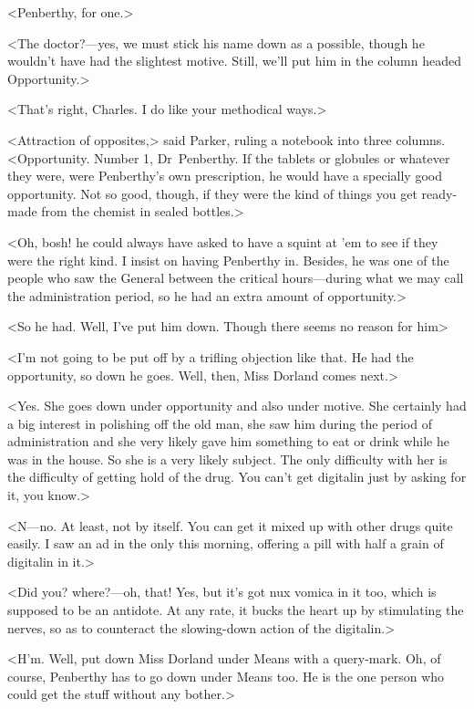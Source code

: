<Penberthy, for one.>

<The doctor?—yes, we must stick his name down as a possible, though he wouldn't have had the slightest motive. Still, we'll put him in the column headed Opportunity.>

<That's right, Charles. I do like your methodical ways.>

<Attraction of opposites,> said Parker, ruling a notebook into three columns. <Opportunity. Number 1, Dr~Penberthy. If the tablets or globules or whatever they were, were Penberthy's own prescription, he would have a specially good opportunity. Not so good, though, if they were the kind of things you get ready-made from the chemist in sealed bottles.>

<Oh, bosh! he could always have asked to have a squint at 'em to see if they were the right kind. I insist on having Penberthy in. Besides, he was one of the people who saw the General between the critical hours—during what we may call the administration period, so he had an extra amount of opportunity.>

<So he had. Well, I've put him down. Though there seems no reason for him\longdash>

<I'm not going to be put off by a trifling objection like that. He had the opportunity, so down he goes. Well, then, Miss Dorland comes next.>

<Yes. She goes down under opportunity and also under motive. She certainly had a big interest in polishing off the old man, she saw him during the period of administration and she very likely gave him something to eat or drink while he was in the house. So she is a very likely subject. The only difficulty with her is the difficulty of getting hold of the drug. You can't get digitalin just by asking for it, you know.>

<N—no. At least, not by itself. You can get it mixed up with other drugs quite easily. I saw an ad in the  only this morning, offering a pill with half a grain of digitalin in it.>

<Did you? where?—oh, that! Yes, but it's got nux vomica in it too, which is supposed to be an antidote. At any rate, it bucks the heart up by stimulating the nerves, so as to counteract the slowing-down action of the digitalin.>

<H'm. Well, put down Miss Dorland under Means with a query-mark. Oh, of course, Penberthy has to go down under Means too. He is the one person who could get the stuff without any bother.>

